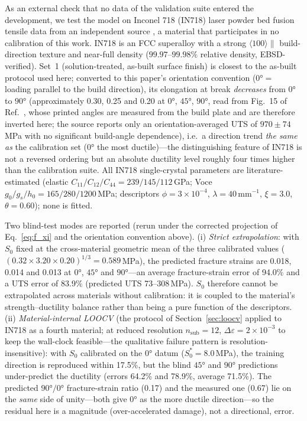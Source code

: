 \documentclass[twocolumn]{sagej}
\begin{document}
As an external check that no data of the validation suite entered the development, we test the model on Inconel 718 (IN718) laser powder bed fusion tensile data from an independent source \cite{hovig2018in718}, a material that participates in no calibration of this work. IN718 is an FCC superalloy with a strong $\langle100\rangle\parallel$ build-direction texture and near-full density ($99.97$--$99.98\%$ relative density, EBSD-verified). Set~1 (solution-treated, as-built surface finish) is closest to the as-built protocol used here; converted to this paper's orientation convention ($\ang{0} =$ loading parallel to the build direction), its elongation at break \emph{decreases} from $\ang{0}$ to $\ang{90}$ (approximately 0.30, 0.25 and 0.20 at $\ang{0}$, $\ang{45}$, $\ang{90}$, read from Fig.~15 of Ref.~\cite{hovig2018in718}, whose printed angles are measured from the build plate and are therefore inverted here; the source reports only an orientation-averaged UTS of $970\pm74$\,MPa with no significant build-angle dependence), i.e.\ a direction trend \emph{the same as} the calibration set ($\ang{0}$ the most ductile)---the distinguishing feature of IN718 is not a reversed ordering but an absolute ductility level roughly four times higher than the calibration suite. All IN718 single-crystal parameters are literature-estimated (elastic $C_{11}/C_{12}/C_{44} = 239/145/112$\,GPa; Voce $g_0/g_s/h_0 = 165/280/1200$\,MPa; descriptors $\phi = 3\times10^{-4}$, $\lambda = 40$\,mm$^{-1}$, $\xi = 3.0$, $\theta = 0.60$); none is fitted.

Two blind-test modes are reported (rerun under the corrected projection of Eq.~\eqref{eq:f_xi} and the orientation convention above). (i) \emph{Strict extrapolation}: with $S_0$ fixed at the cross-material geometric mean of the three calibrated values ($(0.32\times3.20\times0.20)^{1/3} = 0.589$\,MPa), the predicted fracture strains are 0.018, 0.014 and 0.013 at $\ang{0}$, $\ang{45}$ and $\ang{90}$---an average fracture-strain error of 94.0\% and a UTS error of 83.9\% (predicted UTS 73--308\,MPa). $S_0$ therefore cannot be extrapolated across materials without calibration: it is coupled to the material's strength--ductility balance rather than being a pure function of the descriptors. (ii) \emph{Material-internal LOOCV} (the protocol of Section~\ref{sec:loocv} applied to IN718 as a fourth material; at reduced resolution $n_{\mathrm{sub}}=12$, $\Delta\varepsilon = 2\times10^{-3}$ to keep the wall-clock feasible---the qualitative failure pattern is resolution-insensitive): with $S_0$ calibrated on the $\ang{0}$ datum ($S_0^* = 8.0$\,MPa), the training direction is reproduced within 17.5\%, but the blind $\ang{45}$ and $\ang{90}$ predictions under-predict the ductility (errors 64.2\% and 78.9\%, average 71.5\%). The predicted $\ang{90}/\ang{0}$ fracture-strain ratio (0.17) and the measured one (0.67) lie on the \emph{same} side of unity---both give $\ang{0}$ as the more ductile direction---so the residual here is a magnitude (over-accelerated damage), not a directional, error.
\end{document}
